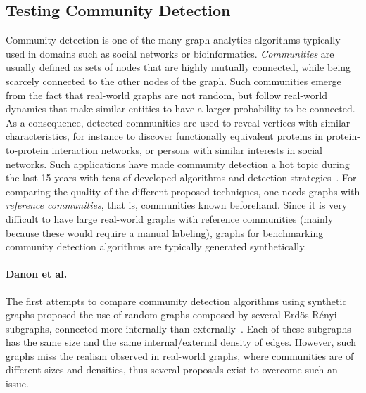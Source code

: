 \subsection{Testing Community Detection}
\label{sec:generators_community_detection}

Community detection is one of the many graph analytics algorithms typically used
in domains such as social networks or bioinformatics. \emph{Communities} are usually defined as sets of nodes that are highly mutually connected, while being scarcely connected to
the other nodes of the graph. Such communities emerge from the fact that real-world graphs
are not random, but follow real-world dynamics that make similar entities to
have a larger probability to be connected. As a consequence, detected
communities are used to reveal vertices with similar characteristics, for
instance to discover functionally equivalent proteins in protein-to-protein
interaction networks, or persons with similar interests in social networks. Such
applications have made community detection a hot topic during the last 15
years with tens of developed algorithms and detection
strategies~\cite{doi:10.1002/wics.1403,Kim:2015:CDM:2854006.2854013}. For
comparing the quality of the different proposed techniques, one needs graphs
with \emph{reference communities}, that is, communities known beforehand. Since
it is very difficult to have large real-world graphs with reference communities
(mainly because these would require a manual labeling), graphs for benchmarking
community detection algorithms are typically generated synthetically.

\paragraph{Danon et al.} The first attempts to compare community detection algorithms using synthetic
graphs proposed the use of random graphs composed by several Erd\"{o}s-R\'{e}nyi
subgraphs, connected more internally than externally~\cite{danon2005comparing}.
Each of these subgraphs has the same size and the same internal/external density
of edges. However, such graphs miss the realism observed in real-world graphs, where
communities are of different sizes and densities, thus several proposals exist
to overcome such an issue.

